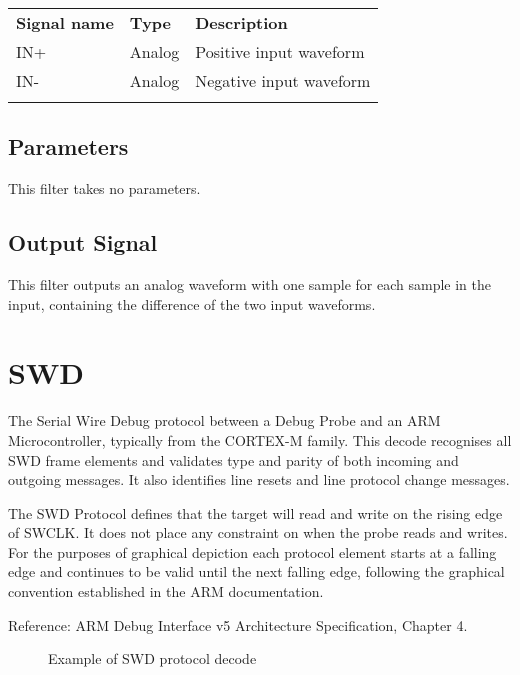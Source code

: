\begin{tabularx}{16cm}{llX}
\thickhline
\textbf{Signal name} & \textbf{Type} & \textbf{Description} \\
\thickhline
IN+ & Analog & Positive input waveform \\
\thinhline
IN- & Analog & Negative input waveform \\
\thickhline
\end{tabularx}

\subsection{Parameters}

This filter takes no parameters.

\subsection{Output Signal}

This filter outputs an analog waveform with one sample for each sample in the input, containing the difference of the
two input waveforms.

\pagebreak
\section{SWD}

The Serial Wire Debug protocol between a Debug Probe and an ARM Microcontroller, typically from the CORTEX-M family. This
decode recognises all SWD frame elements and validates type and parity of both incoming and outgoing messages. It also
identifies line resets and line protocol change messages.

The SWD Protocol defines that the target will read and write on the rising edge of SWCLK. It does not place any constraint
on when the probe reads and writes. For the purposes of graphical depiction each protocol element starts at a falling edge
and continues to be valid until the next falling edge, following the graphical convention established in the ARM documentation.

Reference: ARM Debug Interface v5 Architecture Specification, Chapter 4.

\begin{figure}[h]
\centering
{}
\caption{Example of SWD protocol decode}
\label{swd_example}
\end{figure}


